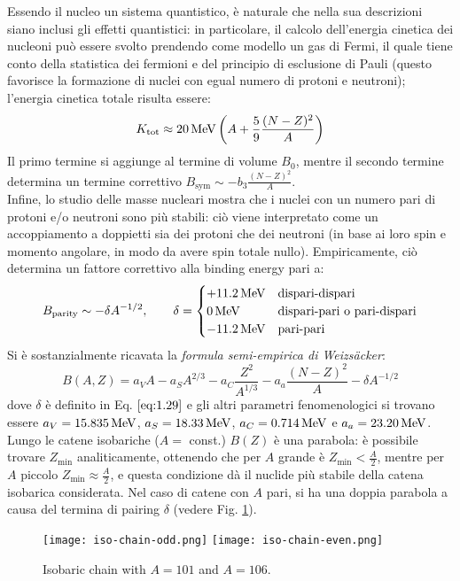 Essendo il nucleo un sistema quantistico, è naturale che nella sua descrizioni siano inclusi gli effetti quantistici: in particolare, il calcolo dell'energia cinetica dei nucleoni può essere svolto prendendo come modello un gas di Fermi, il quale tiene conto della statistica dei fermioni e del principio di esclusione di Pauli (questo favorisce la formazione di nuclei con egual numero di protoni e neutroni); l'energia cinetica totale risulta essere:
\begin{equation}
	K_{\text{tot}} \approx 20 \,\mathrm{MeV} \left( A + \frac{5}{9} \frac{(N - Z)^2}{A} \right)
	\label{eq:1.28}
\end{equation}
Il primo termine si aggiunge al termine di volume $ B_0 $, mentre il secondo termine determina un termine correttivo $ B_{\text{sym}} \sim - b_3 \frac{(N - Z)^2}{A} $.\\
Infine, lo studio delle masse nucleari mostra che i nuclei con un numero pari di protoni e/o neutroni sono più stabili: ciò viene interpretato come un accoppiamento a doppietti sia dei protoni che dei neutroni (in base ai loro spin e momento angolare, in modo da avere spin totale nullo). Empiricamente, ciò determina un fattore correttivo alla binding energy pari a:
\begin{equation}
	B_{\text{parity}} \sim - \delta A^{-1/2}, \qquad \delta =
	\begin{cases}
		+11.2\,\mathrm{MeV} & \text{dispari-dispari} \\
		0\,\mathrm{MeV} & \text{dispari-pari o pari-dispari} \\
		-11.2\,\mathrm{MeV} & \text{pari-pari}
	\end{cases}
	\label{eq:1.29}
\end{equation}
Si è sostanzialmente ricavata la \textit{formula semi-empirica di Weizsäcker}:
\begin{equation}
	B(A,Z) = a_V A - a_S A^{2/3} - a_C \frac{Z^2}{A^{1/3}} - a_a \frac{(N - Z)^2}{A} - \delta A^{-1/2}
	\label{eq:1.30}
\end{equation}
dove $ \delta $ è definito in Eq. $ \ref{eq:1.29} $ e gli altri parametri fenomenologici si trovano essere $ a_V = 15.835\,\mathrm{MeV} $, $ a_S = 18.33\,\mathrm{MeV} $, $ a_C = 0.714\,\mathrm{MeV} $ e $ a_a = 23.20\,\mathrm{MeV} $.\\
Lungo le catene isobariche ($ A = $ const.) $ B(Z) $ è una parabola: è possibile trovare $ Z_{\text{min}} $ analiticamente, ottenendo che per $ A $ grande è $ Z_{\text{min}} < \frac{A}{2} $, mentre per $ A $ piccolo $ Z_{\text{min}} \approx \frac{A}{2} $, e questa condizione dà il nuclide più stabile della catena isobarica considerata. Nel caso di catene con $ A $ pari, si ha una doppia parabola a causa del termina di pairing $ \delta $ (vedere Fig. \ref{iso-chain}).
\begin{figure}[!h]
	\centering
	\texttt{[image: iso-chain-odd.png]}
	\texttt{[image: iso-chain-even.png]}
	\caption{Isobaric chain with $ A = 101 $ and $ A = 106 $.}
	\label{iso-chain}
\end{figure}

